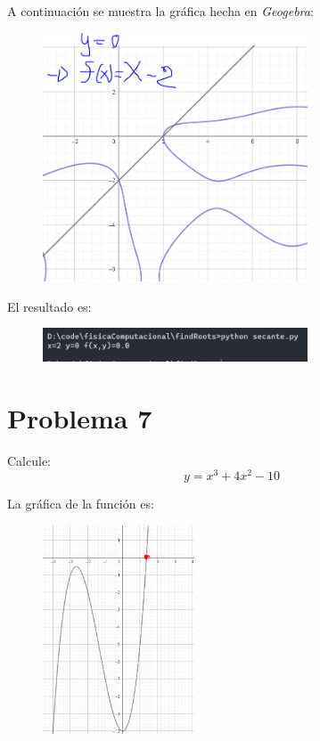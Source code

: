 \documentclass[a4paper,12pt]{article}
\begin{document}
    A continuación se muestra la gráfica hecha en \emph{Geogebra}:
    \begin{figure}[h]
        \centering
        \includegraphics[width=0.7\textwidth]{f6_graph.PNG}
    \end{figure}



    El resultado es:
    \begin{figure}[h]
        \centering
        \includegraphics[width=0.7\textwidth]{f6_console.PNG}
    \end{figure}

    \newpage
    \section{Problema 7}
    Calcule:
    \begin{equation}
        y = x^3 + 4x^2 - 10
    \end{equation}

    La gráfica de la función es:
    \begin{figure}[h]
        \centering
        \includegraphics[width=0.4\textwidth]{f7.PNG}
    \end{figure}
\end{document}
